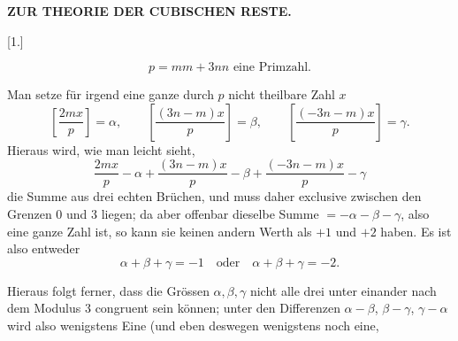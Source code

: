 \clearpage{}
\begin{center}
\bfseries ZUR THEORIE DER CUBISCHEN RESTE.
\end{center}



\begin{center}
[1.]
\end{center}

\[ p=mm+3nn \text{ eine Primzahl.} \]

\noindent\hspace*{\parindent}Man setze für irgend eine ganze durch $p$ nicht theilbare Zahl $x$
\[
\left[\dfrac{2mx}{p}\right]=\alpha,\qquad \left[\dfrac{(3n-m)x}{p}\right]=\beta,\qquad \left[\dfrac{(-3n-m)x}{p}\right]=\gamma.
\]
\noindent Hieraus wird, wie man leicht sieht,
\[
\dfrac{2mx}{p}-\alpha+\dfrac{(3n-m)x}{p}-\beta+\dfrac{(-3n-m)x}{p}-\gamma
\]
die Summe aus drei echten Brüchen, und muss daher exclusive zwischen den
Grenzen 0 und 3 liegen; da aber offenbar dieselbe Summe $=-\alpha-\beta-\gamma$, also
eine ganze Zahl ist, so kann sie keinen andern Werth als $+1$ und $+2$ haben.
Es ist also entweder
\[ \alpha+\beta+\gamma=-1\quad\text{oder}\quad \alpha+\beta+\gamma=-2. \]

\noindent Hieraus folgt ferner, dass die Grössen $\alpha, \beta, \gamma$ nicht alle drei unter einander
nach dem Modulus 3 congruent sein können; unter den Differenzen $\alpha-\beta$, $\beta-\gamma$,
$\gamma-\alpha$ wird also wenigstens Eine (und eben deswegen wenigstens noch eine,
